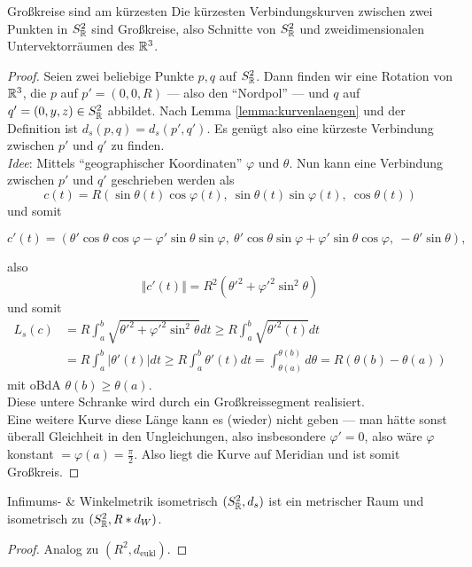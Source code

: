 \begin{lemma}{Großkreise sind am kürzesten}
  Die kürzesten Verbindungskurven zwischen zwei Punkten in $ S^2_{\mathbb{R}} $ sind Großkreise, also Schnitte von $ S^2_{\mathbb{R}} $ und zweidimensionalen Untervektorräumen des $ \mathbb{R}^3 $.
  \begin{proof}
    Seien zwei beliebige Punkte $ p,q $ auf $ S^2_{\mathbb{R}} $. Dann finden wir eine Rotation von $ \mathbb{R}^3 $, die $ p $ auf $ p' = (0,0,R) $ --- also den ``Nordpol'' --- und $ q $ auf $ q' = (0,y,z) \in S^2_{\mathbb{R}} $ abbildet. Nach Lemma \autoref{lemma:kurvenlaengen} und der Definition ist $ d_s(p,q) = d_s(p', q') $. Es genügt also eine kürzeste Verbindung zwischen $ p' $ und $ q' $ zu finden. \\
    \emph{Idee}: Mittels ``geographischer Koordinaten'' $ \varphi $ und $ \theta $. Nun kann eine Verbindung zwischen $ p' $ und $ q' $ geschrieben werden als
    \begin{equation*}
      c(t) = R(\sin\theta(t)\cos\varphi(t), \ \sin\theta(t)\sin\varphi(t), \ \cos\theta(t))
    \end{equation*}
    und somit
    \begin{small}
      \begin{equation*}
        c'(t) = (\theta'\cos\theta\cos\varphi-\varphi'\sin\theta\sin\varphi, \ \theta'\cos\theta\sin\varphi+\varphi'\sin\theta\cos\varphi, \ -\theta'\sin\theta)\text{,}
      \end{equation*}
    \end{small}
    also
    \begin{equation*}
      \Vert c'(t) \Vert = R^2({\theta'}^2 + {\varphi'}^2\sin^2\theta)
    \end{equation*}
    und somit
    \begin{align*}
      L_s(c) &= R\int_a^b\sqrt{{\theta'}^2+{\varphi'}^2\sin^2\theta}dt \geq R\int_a^b\sqrt{{\theta'}^2(t)}dt \\
      &= R\int_a^b \vert \theta'(t) \vert dt \geq R\int_a^b \theta'(t)dt = \int_{\theta(a)}^{\theta(b)}d\theta = R(\theta(b)-\theta(a))
    \end{align*}
    mit oBdA $ \theta(b) \geq \theta(a) $. \\
    Diese untere Schranke wird durch ein Großkreissegment realisiert. \\
    Eine weitere Kurve diese Länge kann es (wieder) nicht geben --- man hätte sonst überall Gleichheit in den Ungleichungen, also insbesondere $ \varphi' = 0 $, also wäre $ \varphi $ konstant $ = \varphi(a) = \frac{\pi}{2} $. Also liegt die Kurve auf Meridian und ist somit Großkreis.
  \end{proof}
\end{lemma}

\begin{theorem}{Infimums- \& Winkelmetrik isometrisch}
  $ (S^2_{\mathbb{R}}, d_s) $ ist ein metrischer Raum und isometrisch zu $ (S^2_{\mathbb{R}}, R*d_W) $.
  \begin{proof}
    Analog zu $ (R^2, d_\text{eukl}) $.
  \end{proof}
\end{theorem}